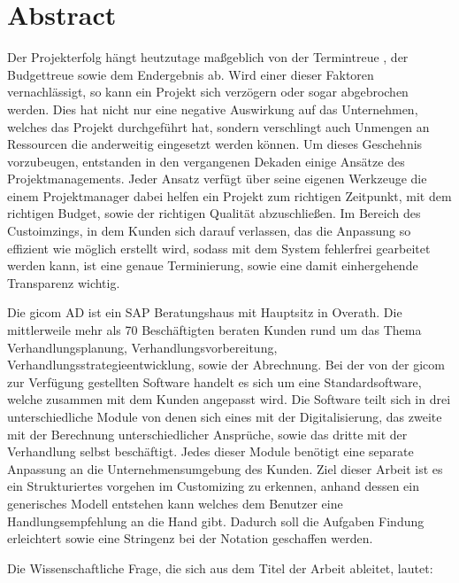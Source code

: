 \thispagestyle{plain}
\chapter{Abstract}
\label{sec:einleitung}

	
	Der Projekterfolg hängt heutzutage maßgeblich von der Termintreue , der Budgettreue sowie dem Endergebnis ab. Wird einer dieser Faktoren vernachlässigt, so kann ein Projekt sich verzögern oder sogar abgebrochen werden. Dies hat nicht nur eine negative Auswirkung auf das Unternehmen, welches das Projekt durchgeführt hat, sondern verschlingt auch Unmengen an Ressourcen die anderweitig eingesetzt werden können. Um dieses Geschehnis vorzubeugen, entstanden in den vergangenen Dekaden einige Ansätze des Projektmanagements. Jeder Ansatz verfügt über seine eigenen Werkzeuge die einem Projektmanager dabei helfen ein Projekt zum richtigen Zeitpunkt, mit dem richtigen Budget, sowie der richtigen Qualität abzuschließen. Im Bereich des Custoimzings, in dem Kunden sich darauf verlassen, das die Anpassung so effizient wie möglich erstellt wird, sodass mit dem System fehlerfrei gearbeitet werden kann, ist eine genaue Terminierung, sowie eine damit einhergehende Transparenz wichtig. 

	Die gicom AD ist ein SAP Beratungshaus mit Hauptsitz in Overath. Die mittlerweile mehr als 70 Beschäftigten beraten Kunden rund um das Thema Verhandlungsplanung, Verhandlungsvorbereitung, Verhandlungsstrategieentwicklung, sowie der Abrechnung. Bei der von der gicom zur Verfügung gestellten Software handelt es sich um eine Standardsoftware, welche zusammen mit dem Kunden angepasst wird. Die Software teilt sich in drei unterschiedliche Module von denen sich eines mit der Digitalisierung, das zweite mit der Berechnung unterschiedlicher Ansprüche, sowie das dritte mit der Verhandlung selbst beschäftigt. Jedes dieser Module benötigt eine separate Anpassung an die Unternehmensumgebung des Kunden. Ziel dieser Arbeit ist es ein Strukturiertes vorgehen im Customizing zu erkennen, anhand dessen ein generisches Modell entstehen kann welches dem Benutzer eine Handlungsempfehlung an die Hand gibt. Dadurch soll die Aufgaben Findung  erleichtert sowie eine Stringenz bei der Notation geschaffen werden.
	
	Die Wissenschaftliche Frage, die sich aus dem Titel der Arbeit ableitet, lautet:
	
	\begin{quote}
		\wissenschaftlicheFrage
	\end{quote}

